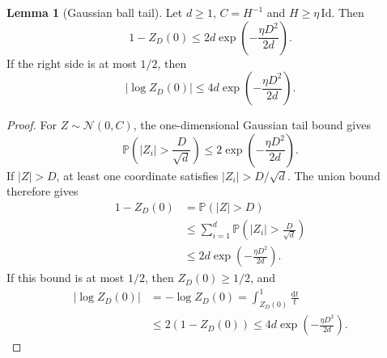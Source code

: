 \documentclass[10pt,reqno]{amsart}
\theoremstyle{definition}
\newtheorem{lemma}[definition]{Lemma}
\theoremstyle{remark}
\numberwithin{equation}{section}
\numberwithin{figure}{section}
\newcommand{\dd}{\mathrm d}
\begin{document}
\begin{lemma}[Gaussian ball tail]\label{lem:gaussian-ball-tail}
Let $d\ge1$, $C=H^{-1}$ and $H\ge\eta\,\mathrm{Id}$. Then
\begin{equation}\label{eq:zero-coupling-tail}
1-Z_D(0)\le2d\exp\left(-\frac{\eta D^2}{2d}\right).
\end{equation}
If the right side is at most $1/2$, then
\begin{equation}\label{eq:zero-coupling-log-bound}
|\log Z_D(0)|\le4d\exp\left(-\frac{\eta D^2}{2d}\right).
\end{equation}
\end{lemma}
\begin{proof}
For $Z\sim\mathcal N(0,C)$, the one-dimensional Gaussian tail bound gives
\begin{equation}\label{eq:coordinate-gaussian-tail}
\mathbb P\left(|Z_i|>\frac D{\sqrt d}\right)
\le2\exp\left(-\frac{\eta D^2}{2d}\right).
\end{equation}
If $|Z|>D$, at least one coordinate satisfies $|Z_i|>D/\sqrt d$.
The union bound therefore gives
\begin{equation}\label{eq:gaussian-tail-union}
\begin{aligned}
1-Z_D(0)&=\mathbb P(|Z|>D)\\
&\le\sum_{i=1}^d\mathbb P\left(|Z_i|>\frac D{\sqrt d}\right)\\
&\le2d\exp\left(-\frac{\eta D^2}{2d}\right).
\end{aligned}
\end{equation}
If this bound is at most $1/2$, then $Z_D(0)\ge1/2$, and
\begin{equation}\label{eq:gaussian-mass-log-calculation}
\begin{aligned}
|\log Z_D(0)|&=-\log Z_D(0)
=\int_{Z_D(0)}^1\frac{\dd t}{t}\\
&\le2(1-Z_D(0))
\le4d\exp\left(-\frac{\eta D^2}{2d}\right).
\end{aligned}
\end{equation}
\end{proof}
\end{document}
